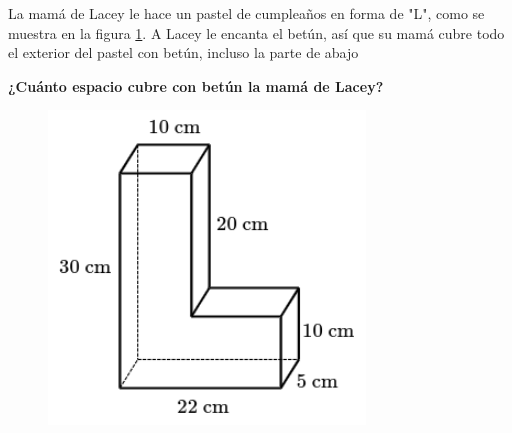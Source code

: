 La mamá de Lacey le hace un pastel de cumpleaños en forma de "L", como se muestra en la figura \ref{fig:vol_area_02}.
A Lacey le encanta el betún, así que su mamá cubre todo el exterior del pastel con betún, incluso la parte de abajo

\textbf{¿Cuánto espacio cubre con betún la mamá de Lacey?}\\

\begin{minipage}{0.3\linewidth}
    \begin{figure}[H]
        \begin{center}
            \includegraphics[width=0.75\textwidth]{../images/vol_area_02}
        \end{center}
        \caption{}
        \label{fig:vol_area_02}
    \end{figure}
\end{minipage}
\begin{minipage}{0.7\linewidth}
    \begin{solutionbox}{5cm}
    \end{solutionbox}
\end{minipage}